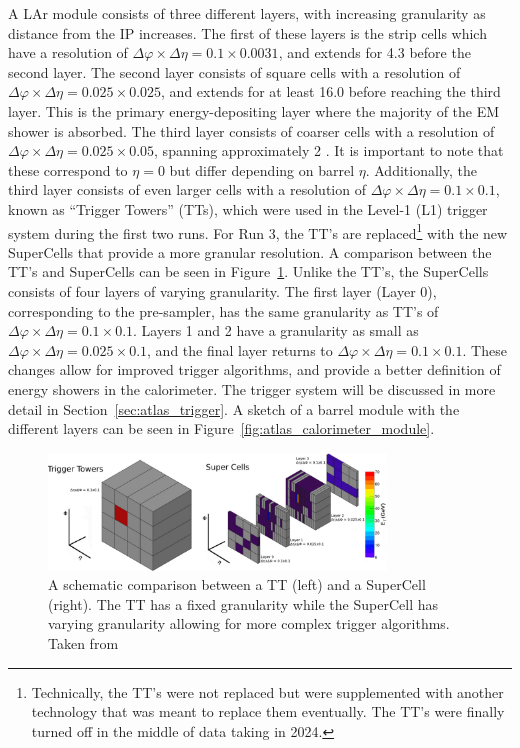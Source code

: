 A LAr module consists of three different layers, with increasing granularity as distance from the IP increases\@. The first of these layers is the strip cells which have a resolution of $\Delta\varphi \times \Delta\eta = 0.1 \times 0.0031$, and extends for 4.3 \radlength{} before the second layer. The second layer consists of square cells with a resolution of $\Delta\varphi \times \Delta\eta = 0.025 \times 0.025$, and extends for at least 16.0 \radlength{} before reaching the third layer. This is the primary energy-depositing layer where the majority of the EM shower is absorbed. The third layer consists of coarser cells with a resolution of $\Delta\varphi \times \Delta\eta = 0.025 \times 0.05$, spanning approximately 2 \radlength. It is important to note that these \radlength{} correspond to $\eta = 0$ but differ depending on barrel $\eta$. Additionally, the third layer consists of even larger cells with a resolution of $\Delta\varphi \times \Delta\eta = 0.1 \times 0.1$, known as ``Trigger Towers'' (TTs), which were used in the Level-1 (L1) trigger system during the first two runs. For Run 3, the TT's are replaced\footnote{Technically, the TT's were not replaced but were supplemented with another technology that was meant to replace them eventually. The TT's were finally turned off in the middle of data taking in 2024.} with the new SuperCells that provide a more granular resolution. A comparison between the TT's and SuperCells can be seen in Figure~\ref{fig:atlas_super_cells}. Unlike the TT's, the SuperCells consists of four layers of varying granularity. The first layer (Layer 0), corresponding to the pre-sampler, has the same granularity as TT's of $\Delta\varphi \times \Delta\eta = 0.1 \times 0.1$. Layers 1 and 2 have a granularity as small as $\Delta\varphi \times \Delta\eta = 0.025 \times 0.1$, and the final layer returns to $\Delta\varphi \times \Delta\eta = 0.1 \times 0.1$. These changes allow for improved trigger algorithms, and provide a better definition of energy showers in the calorimeter. The trigger system will be discussed in more detail in Section~\ref{sec:atlas_trigger}. A sketch of a barrel module with the different layers can be seen in Figure~\ref{fig:atlas_calorimeter_module}.

\begin{figure}[htp]
    \centering
    \includegraphics[width=0.8\textwidth]{figures/atlas/atlas_calorimeter_tt_to_supercell.jpg}
    \caption{A schematic comparison between a TT (left) and a SuperCell (right). The TT has a fixed granularity while the SuperCell has varying granularity allowing for more complex trigger algorithms. Taken from~\cite{atlas_calorimeter_supercell}}\label{fig:atlas_super_cells}
\end{figure}

